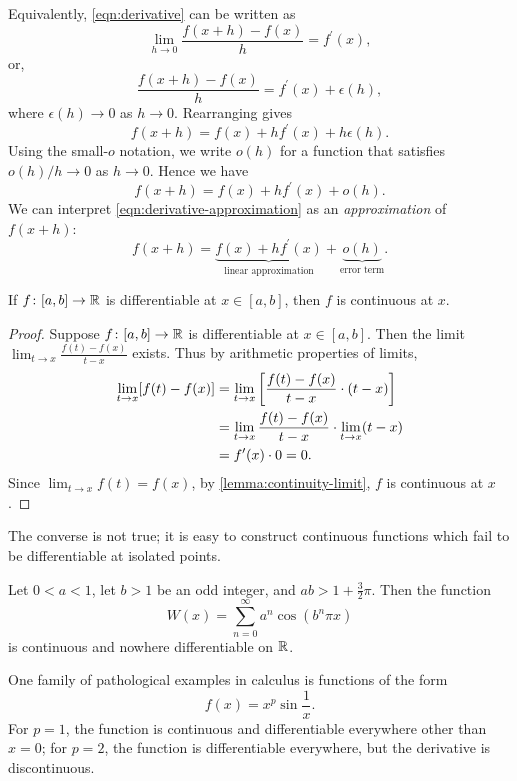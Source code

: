Equivalently, \eqref{eqn:derivative} can be written as
\[\lim_{h\to0}\frac{f(x+h)-f(x)}{h}=f^\prime(x),\]
or,
\[\frac{f(x+h)-f(x)}{h}=f^\prime(x)+\epsilon(h),\]
where $\epsilon(h)\to0$ as $h\to0$. Rearranging gives
\[f(x+h)=f(x)+hf^\prime(x)+h\epsilon(h).\]
Using the small-$o$ notation, we write $o(h)$ for a function that satisfies $o(h)/h\to0$ as $h\to0$. Hence we have
\begin{equation}\label{eqn:derivative-approximation}
f(x+h)=f(x)+hf^\prime(x)+o(h).
\end{equation}
We can interpret \eqref{eqn:derivative-approximation} as an \emph{approximation} of $f(x+h)$:
\[f(x+h)=\underbrace{f(x)+hf^\prime(x)}_\text{linear approximation}+\underbrace{o(h)}_\text{error term}.\]

\begin{lemma}\label{lemma:diff-cont}
If $f\colon [a,b]\to\mathbb R$ is differentiable at $x\in[a,b]$, then $f$ is continuous at $x$.
\end{lemma}

\begin{proof}
Suppose $f\colon [a,b]\to\mathbb R$ is differentiable at $x\in[a,b]$. Then the limit $\displaystyle\lim_{t\to x}\frac{f(t)-f(x)}{t-x}$ exists. Thus by arithmetic properties of limits,
\begin{align*}
\lim_{t\to x}[f(t)-f(x)]
&=\lim_{t\to x}\left[\frac{f(t)-f(x)}{t-x}\cdot(t-x)\right]\\
&=\lim_{t\to x}\frac{f(t)-f(x)}{t-x}\cdot\lim_{t\to x}(t-x)\\
&=f^\prime(x)\cdot0=0.
\end{align*}
Since $\displaystyle\lim_{t\to x}f(t)=f(x)$, by \ref{lemma:continuity-limit}, $f$ is continuous at $x$.
\end{proof}

\begin{remark}
The converse is not true; it is easy to construct continuous functions which fail to be differentiable at isolated points.
\end{remark}

\begin{example}
Let $0<a<1$, let $b>1$ be an odd integer, and $ab>1+\frac{3}{2}\pi$. Then the function
\[W(x)=\sum_{n=0}^{\infty}a^n\cos(b^n\pi x)\]
is continuous and nowhere differentiable on $\mathbb R$.
\end{example}

\begin{example}
One family of pathological examples in calculus is functions of the form
\[f(x)=x^p\sin\frac{1}{x}.\]
For $p=1$, the function is continuous and differentiable everywhere other than $x=0$; for $p=2$, the function is differentiable everywhere, but the derivative is discontinuous.
\end{example}

